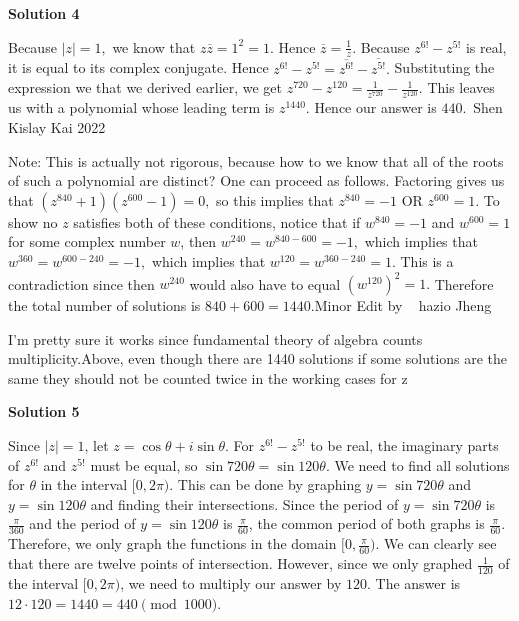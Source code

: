 \begin{enumerate}
 



\textbf{Solution 4}

Because $|z| = 1,$ we know that $z\overline{z} = 1^2 = 1.$ Hence $\overline{z} = \frac 1 {z}.$ Because $z^{6!}-z^{5!}$ is real, it is equal to its complex conjugate. Hence $z^{6!}-z^{5!} = \overline{z^{6!}}-\overline{z^{5!}}.$ Substituting the expression we that we derived earlier, we get $z^{720}-z^{120} = \frac 1{z^{720}} - \frac 1{z^{120}}.$ This leaves us with a polynomial whose leading term is $z^{1440}.$ Hence our answer is $\boxed{440}$.~Shen Kislay Kai 2022

 Note: This is actually not rigorous, because how to we know that all of the roots of such a polynomial are distinct? One can proceed as follows. Factoring gives us that $(z^{840}+1)(z^{600}-1)=0,$ so this implies that $z^{840} = -1$ OR $z^{600}=1.$ To show no $z$ satisfies both of these conditions, notice that if $w^{840} = -1$ and $w^{600}=1$ for some complex number $w$, then $w^{240} = w^{840-600} = -1,$ which implies that $w^{360} = w^{600-240}=-1,$ which implies that $w^{120}=w^{360-240}=1.$ This is a contradiction since then $w^{240}$ would also have to equal $(w^{120})^2 = 1.$ Therefore the total number of solutions is $840+600 = 1\boxed{440}.$Minor Edit by ~ hazio Jheng

 I'm pretty sure it works since fundamental theory of algebra counts multiplicity.Above, even though there are 1440 solutions if some solutions are the same they should not be counted twice in the working cases for z

 



\textbf{Solution 5}

Since $|z|=1$, let $z=\cos \theta + i\sin \theta$. For $z^{6!}-z^{5!}$ to be real, the imaginary parts of $z^{6!}$ and $z^{5!}$ must be equal, so $\sin 720\theta=\sin 120\theta$. We need to find all solutions for $\theta$ in the interval $[0,2\pi)$. This can be done by graphing $y=\sin 720\theta$ and $y=\sin 120\theta$ and finding their intersections. Since the period of $y=\sin 720\theta$ is $\frac{\pi}{360}$ and the period of $y=\sin 120\theta$ is $\frac{\pi}{60}$, the common period of both graphs is $\frac{\pi}{60}$. Therefore, we only graph the functions in the domain $[0, \frac{\pi}{60})$. We can clearly see that there are twelve points of intersection. However, since we only graphed $\frac{1}{120}$ of the interval $[0,2\pi)$, we need to multiply our answer by $120$. The answer is $12 \cdot 120 = 1440 = \boxed{440} \pmod{1000}$.


\end{enumerate}
